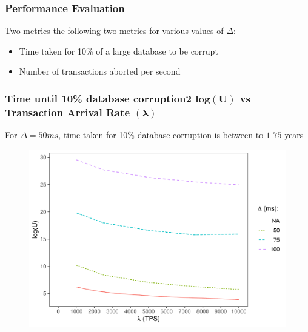 \begin{frame}
  \frametitle{Performance Evaluation}
  Two metrics the following two metrics for various values of $\Delta$:
  \begin{itemize}
  \item Time taken for 10\% of a large database to be corrupt
    \item Number of transactions aborted per second
  \end{itemize}
\end{frame}

\begin{frame}
  \frametitle{Time until 10\% database corruption2 $\boldsymbol{log(U)}$ vs Transaction Arrival Rate $(\boldsymbol{\lambda})$}
  \begin{center}
    For $\Delta = 50ms$, time taken for 10\% database corruption is between to $1$-$75$ years
  \end{center}
    \begin{figure}[h!]
    \centering
    \includegraphics[scale=0.5]{./figures/delta}
  \end{figure}
\end{frame}

